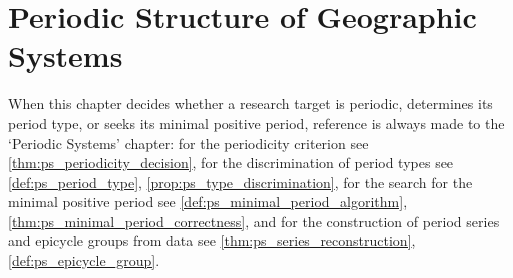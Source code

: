 \chapter{Periodic Structure of Geographic Systems}
\label{chap:geo-periodic}

\begin{remark}\label{rem:geo_ps_hook}
When this chapter decides whether a research target is periodic, determines its period type, or seeks its minimal positive period, reference is always made to the `Periodic Systems' chapter:
for the periodicity criterion see \cref{thm:ps_periodicity_decision},
for the discrimination of period types see \cref{def:ps_period_type}, \cref{prop:ps_type_discrimination},
for the search for the minimal positive period see \cref{def:ps_minimal_period_algorithm}, \cref{thm:ps_minimal_period_correctness},
and for the construction of period series and epicycle groups from data see \cref{thm:ps_series_reconstruction}, \cref{def:ps_epicycle_group}.
\end{remark}

